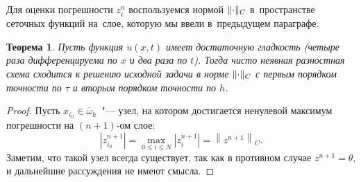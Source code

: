 \documentclass[11pt,a4paper,twoside,listtotoc,bibtotoc]{report}
\numberwithin{equation}{section}
\theoremstyle{definition}
\theoremstyle{plain}
\newtheorem*{theorem*}{Теорема}
\DeclarePairedDelimiter\norm{\lVert}{\rVert}
\begin{document}
Для оценки погрешности $z_i^n$ воспользуемся нормой $\norm{\cdot}_C$
в~пространстве сеточных функций на~слое, которую мы ввели в~предыдущем
параграфе.
%
\begin{theorem*}
%
    Пусть функция $u(x, t)$ имеет достаточную гладкость (четыре раза дифференцируема
    по $x$ и два раза по $t$). Тогда чисто неявная разностная схема сходится к решению
    исходной задачи в норме $\norm{\cdot}_C$ с первым порядком точности по $\tau$ и
    вторым порядком точности по $h$.
%
\end{theorem*}
%
%
\begin{proof}
%
Пусть $x_{i_0}\in \overline{\omega}_h$~"--- узел, на котором
достигается ненулевой максимум погрешности на $(n+1)$-ом слое:
%
$$
    \left|z_{i_0}^{n+1}\right| = \max_{0 \leqslant i \leqslant N} \left|z_i^{n+1}\right| = \left\|z^{n+1}\right\|_C.
$$
%
Заметим, что такой узел всегда существует, так как в противном случае
$z^{n+1} = \theta$, и дальнейшие рассуждения не имеют смысла.


\end{proof}
\end{document}

